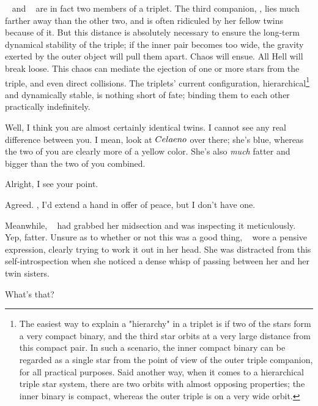 \documentclass[main.tex]{subfiles}
\begin{document}
\par \nar \rmtaygete~ and \rmalcyone~ are in fact two members of a triplet.  The third companion, \rmcelaeno, lies much farther away than the other two, and is often ridiculed by her fellow twins because of it.  But this distance is absolutely necessary to ensure the long-term dynamical stability of the triple;  if the inner pair becomes too wide, the gravity exerted by the outer object will pull them apart.  Chaos will ensue.  All Hell will break loose.  This chaos can mediate the ejection of one or more stars from the triple, and even direct collisions.  The triplets' current configuration, hierarchical\footnote{The easiest way to explain a "hierarchy" in a triplet is if two of the stars form a very compact binary, and the third star orbits at a very large distance from this compact pair.  In such a scenario, the inner compact binary can be regarded as a single star from the point of view of the outer triple companion, for all practical purposes.  Said another way, when it comes to a hierarchical triple star system, there are two orbits with almost opposing properties; the inner binary is compact, whereas the outer triple is on a very wide orbit.} and dynamically stable, is nothing short of fate; binding them to each other practically indefinitely.

\par \Maia Well, I think you are almost certainly identical twins.  I cannot see any real difference between you.  I mean, look at $Celaeno$ over there; she's blue, whereas the two of you are clearly more of a yellow color.  She's also \textit{much} fatter and bigger than the two of you combined.  

\par \Celaeno Alright, I see your point.

\par \Taygete Agreed.  \rmalcyone, I'd extend a hand in offer of peace, but I don't have one.

\par \nar Meanwhile, \rmcelaeno~ had grabbed her midsection and was inspecting it meticulously.  Yep, fatter.  Unsure as to whether or not this was a good thing, \rmcelaeno~ wore a pensive expression, clearly trying to work it out in her head.  She was distracted from this self-introspection when she noticed a dense whisp of \Pleione passing between her and her twin sisters.  

\par \Celaeno What's that?
\end{document}
